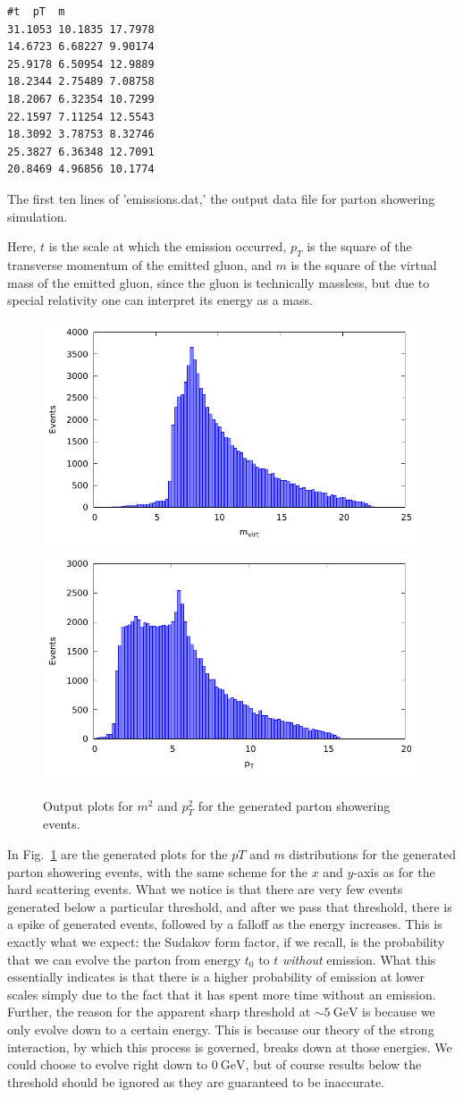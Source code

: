 \begin{listing}[!ht]
\begin{verbatim}
#t	pT	m
31.1053	10.1835	17.7978	
14.6723	6.68227	9.90174	
25.9178	6.50954	12.9889	
18.2344	2.75489	7.08758	
18.2067	6.32354	10.7299	
22.1597	7.11254	12.5543	
18.3092	3.78753	8.32746	
25.3827	6.36348	12.7091	
20.8469	4.96856	10.1774	
\end{verbatim}
\caption{The first ten lines of 'emissions.dat,' the output data file for parton showering simulation.}
\label{listing:emissions-dat}
\end{listing}

Here, $t$ is the scale at which the emission occurred, $p_T$ is the square of the transverse momentum of the emitted gluon, and $m$ is the square of the virtual mass of the emitted gluon, since the gluon is technically massless, but due to special relativity one can interpret its energy as a mass.

\begin{figure}[ht]
  \centering
  \includegraphics[width=0.4\linewidth]{./res/Images/m.pdf}
  \includegraphics[width=0.4\linewidth]{./res/Images/pT.pdf}
  \caption{Output plots for $m^2$ and $p_T^2$ for the generated parton showering events.}
  \label{fig:partonshower-dist}
\end{figure}

In Fig.~\ref{fig:partonshower-dist} are the generated plots for the $pT$ and $m$ distributions for the generated parton showering events, with the same scheme for the $x$ and $y$-axis as for the hard scattering events. What we notice is that there are very few events generated below a particular threshold, and after we pass that threshold, there is a spike of generated events, followed by a falloff as the energy increases. This is exactly what we expect: the Sudakov form factor, if we recall, is the probability that we can evolve the parton from energy $t_0$ to $t$ \textit{without} emission. What this essentially indicates is that there is a higher probability of emission at lower scales simply due to the fact that it has spent more time without an emission. Further, the reason for the apparent sharp threshold at $\sim\qty{5}{\giga\electronvolt}$ is because we only evolve down to a certain energy. This is because our theory of the strong interaction, by which this process is governed, breaks down at those energies. We could choose to evolve right down to $\qty{0}{\giga\electronvolt}$, but of course results below the threshold should be ignored as they are guaranteed to be inaccurate.


